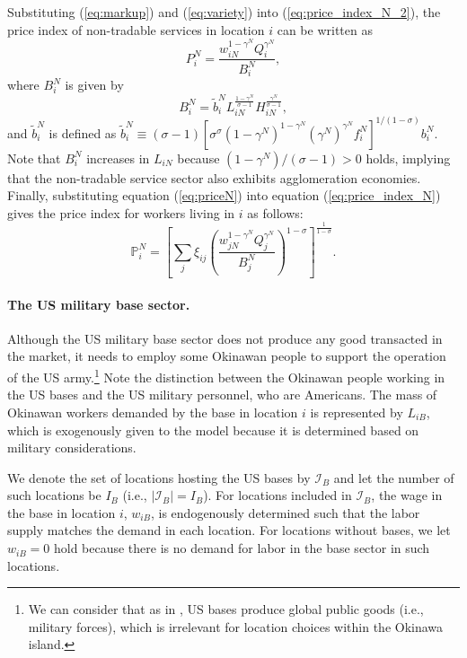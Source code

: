 \documentclass[12pt, unicode, a4paper]{article}
\newcommand{\1}{\mbox{1}\hspace{-0.25em}\mbox{l}} %
\begin{document}
Substituting (\ref{eq:markup}) and (\ref{eq:variety}) into (\ref{eq:price_index_N_2}), the price index of non-tradable services in location $i$ can be written as
\begin{equation}
\label{eq:priceN}
    P_{i}^N=\frac{w_{iN}^{1-\gamma^N}Q_i^{\gamma^N}}{B_i^N},
\end{equation}
where $B_i^N$ is given by
\begin{equation}
\label{eq:productivityN}
    B_i^N=\widetilde{b}_i^N L_{iN}^{\frac{1-\gamma^N}{\sigma-1}} H_{iN}^{\frac{\gamma^N}{\sigma-1}},
\end{equation}
and $\widetilde{b}_i^N$ is defined as $\widetilde{b}_i^N \equiv (\sigma-1)\left[ \sigma^\sigma (1-\gamma^N)^{1-\gamma^N}(\gamma^N)^{\gamma^N} f_i^N \right]^{1/(1-\sigma)} b_i^N$. Note that $B_i^N$ increases in $L_{iN}$ because $(1-\gamma^N)/(\sigma-1)>0$ holds, implying that the non-tradable service sector also exhibits agglomeration economies. 
Finally, substituting equation (\ref{eq:priceN}) into equation (\ref{eq:price_index_N}) gives the price index for workers living in $i$ as follows:
\begin{equation}
\label{eq:price_index_N_3}
    \mathbb{P}_{i}^N=\left[
    \sum_j \xi_{ij} \left( \frac{w_{jN}^{1-\gamma^N}Q_j^{\gamma^N}}{B_j^N} \right)^{1-\sigma}
    \right]^{\frac{1}{1-\sigma}}.
\end{equation}

\paragraph{The US military base sector.}
Although the US military base sector does not produce any good transacted in the market, it needs to employ some Okinawan people to support the operation of the US army.\footnote{
We can consider that as in \cite{becker2021impact}, US bases produce global public goods (i.e., military forces), which is irrelevant for location choices within the Okinawa island.
}
Note the distinction between the Okinawan people working in the US bases and the US military personnel, who are Americans.
The mass of Okinawan workers demanded by the base in location $i$ is represented by $L_{iB}$, which is exogenously given to the model because it is determined based on military considerations.

We denote the set of locations hosting the US bases by $\mathcal{I}_B$ and let the number of such locations be $I_B$ (i.e., $|\mathcal{I}_B|=I_B$). For locations included in $\mathcal{I}_B$, the wage in the base in location $i$, $w_{iB}$, is endogenously determined such that the labor supply matches the demand in each location. For locations without bases, we let $w_{iB}=0$ hold because there is no demand for labor in the base sector in such locations.
\end{document}
